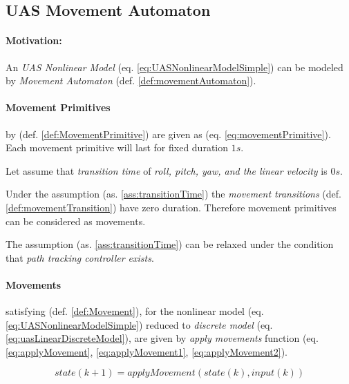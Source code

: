 \subsection{UAS Movement Automaton}\label{s:movementAutomatonDefinition}

\paragraph{Motivation:} An \emph{UAS Nonlinear Model} (eq. \ref{eq:UASNonlinearModelSimple}) can be modeled by \emph{Movement Automaton} (def. \ref{def:movementAutomaton}). 

\paragraph{Movement Primitives} by (def. \ref{def:MovementPrimitive})  are given as (eq. \ref{eq:movementPrimitive}). Each movement primitive will last for fixed duration $1s$.
 

\begin{assumption}\label{ass:transitionTime}
    Let assume that \emph{transition time} of \emph{roll, pitch, yaw, and the linear velocity} is $0 s$.
\end{assumption}

Under the assumption (as. \ref{ass:transitionTime}) the \emph{movement transitions} (def. \ref{def:movementTransition}) have zero duration. Therefore movement primitives can be considered as movements.

\begin{note}
    The assumption (as. \ref{ass:transitionTime}) can be relaxed under the condition that \emph{path tracking controller exists}.
\end{note}

\paragraph{Movements} satisfying (def. \ref{def:Movement}), for the nonlinear model (eq. \ref{eq:UASNonlinearModelSimple}) reduced to \emph{discrete model} (eq. \ref{eq:uasLinearDiscreteModel}), are given by \emph{apply movements} function (eq. \ref{eq:applyMovement}, \ref{eq:applyMovement1}, \ref{eq:applyMovement2}).

\begin{equation}\label{eq:uasLinearDiscreteModel}
    state(k+1) = applyMovement(state(k), input(k)) 
\end{equation}

